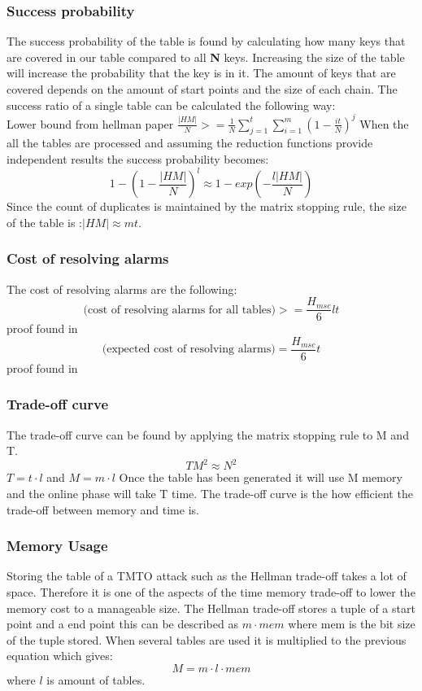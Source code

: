 \subsubsection*{Success probability}
The success probability of the table is found by calculating how many keys that are covered in our table compared to all \textbf{N} keys. Increasing the size of the table will increase the probability that the key is in it. The amount of keys that are covered depends on the amount of start points and the size of each chain. The success ratio of a single table can be calculated the following way:\\
Lower bound from hellman paper\cite{176}
$\frac{|HM|}{N}>=\frac{1}{N}\sum^{t}_{j=1}\sum^{m}_{i=1}(1-\frac{it}{N})^{j} $
When the all the tables are processed and assuming the reduction functions provide independent results the success probability becomes:
\[1-(1-\frac{|HM|}{N})^l\approx 1- exp(-\frac{l|HM|}{N})\]
Since the count of duplicates is maintained by the matrix stopping rule, the size of the table is :$|HM|\approx mt$.
\subsubsection{Cost of resolving alarms}
The cost of resolving alarms are the following:
\begin{equation}
\text{(cost of resolving alarms for all tables)}>=\frac{H_{msc}}{6}lt
\end{equation}
proof found in \cite{176}
\begin{equation}
\text{(expected cost of resolving alarms)}=\frac{H_{msc}}{6}t
\end{equation}
proof found in \cite{176}
\subsubsection{Trade-off curve}
The trade-off curve can be found by applying the matrix stopping rule to M and T.
\begin{equation}
TM^2\approx N^2
\end{equation}
$T=t \cdot l$ and $M=m\cdot l$
Once the table has been generated it will use M memory and the online phase will take T time.
The trade-off curve is the how efficient the trade-off between memory and time is.

\subsubsection{Memory Usage}
Storing the table of a TMTO attack such as the Hellman trade-off takes a lot of space. Therefore it is one of the aspects of the time memory trade-off to lower the memory cost to a manageable size. The Hellman trade-off stores a tuple of a start point and a end point this can be described as $m\cdot mem$ where mem is the bit size of the  tuple stored. When several tables are used it is multiplied to the previous equation which gives:
\begin{equation}
M=m\cdot l \cdot mem
\end{equation}
where $l$ is amount of tables.
